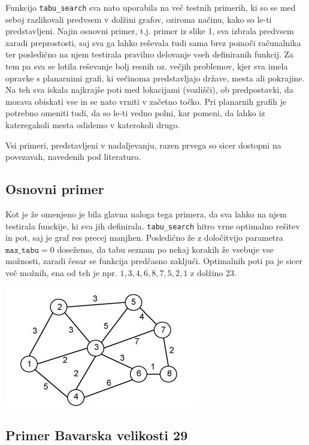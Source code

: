 \documentclass[10pt, a4paper]{article}
\begin{document}
Funkcijo \texttt{tabu\_search} sva nato uporabila na več testnih primerih, ki so se med seboj razlikovali predvsem v dolžini grafov, oziroma načinu, kako so le-ti predstavljeni. Najin osnovni primer, t.j. primer iz slike 1, sva izbrala predvsem zaradi preprostosti, saj sva ga lahko reševala tudi sama brez pomoči računalnika ter posledično na njem testirala pravilno delovanje vseh definiranih funkcij. Za tem pa sva se lotila reševanje bolj resnih oz. večjih problemov, kjer sva imela opravke s planarnimi grafi, ki večinoma predstavljajo države, mesta ali pokrajine. Na teh sva iskala najkrajše poti med lokacijami (vozlišči), ob predpostavki, da morava obiskati vse in se nato vrniti v začetno točko. Pri planarnih grafih je potrebno omeniti tudi, da so le-ti vedno polni, kar pomeni, da lahko iz kateregakoli mesta odidemo v katerokoli drugo.

Vsi primeri, predstavljeni v nadaljevanju, razen prvega so sicer dostopni na povezavah, navedenih pod literaturo.



\subsection{Osnovni primer}

Kot je že omenjeno je bila glavna naloga tega primera, da sva lahko na njem testirala funckije, ki sva jih definirala. \texttt{tabu\_search} hitro vrne optimalno rešitev in pot, saj je graf res precej manjhen. Posledično že z določitvijo parametra $\texttt{max\_tabu} = 0$ dosežemo, da tabu seznam po nekaj korakih že vsebuje vse možnosti, zaradi česar se funkcija predčasno zaključi. Optimalnih poti pa je sicer več možnih, ena od teh je npr. $1, 3, 4, 6, 8, 7, 5, 2, 1$ z dolžino 23.

\begin{center}
\includegraphics[scale=0.4]{slika1}
\end{center}



\subsection{Primer Bavarska velikosti 29}
\end{document}
